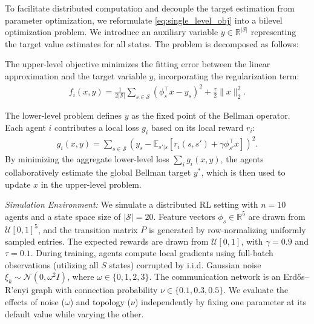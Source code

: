 \documentclass{article}
\theoremstyle{plain}
\theoremstyle{definition}
\theoremstyle{remark}
\begin{document}
To facilitate distributed computation and decouple the target estimation from parameter optimization, we reformulate \eqref{eq:single_level_obj} into a bilevel optimization problem. We introduce an auxiliary variable $y \in \mathbb{R}^{|\mathcal{S}|}$ representing the target value estimates for all states. The problem is decomposed as follows:


The upper-level objective minimizes the fitting error between the linear approximation and the target variable $y$, incorporating the regularization term:
\begin{align} \label{eq:upper_level_split}
    f_{i}(x, y) = \frac{1}{2|\mathcal{S}|} \sum_{s \in \mathcal{S}} (\phi_s^\top x - y_s)^2 + \frac{\tau}{2}\|x\|_2^{2}.
\end{align}

The lower-level problem defines $y$ as the fixed point of the Bellman operator. Each agent $i$ contributes a local loss $g_i$ based on its local reward $r_i$:
\begin{align} \label{eq:lower_level_split}
    g_i(x, y) = \sum_{s \in \mathcal{S}} \left( y_s - \mathbb{E}_{s'|s} \left[ r_i(s, s') + \gamma \phi_{s'}^\top x \right] \right)^2.
\end{align}
By minimizing the aggregate lower-level loss $\sum_i g_i(x,y)$, the agents collaboratively estimate the global Bellman target $y^*$, which is then used to update $x$ in the upper-level problem.

\textit{Simulation Environment:} We simulate a distributed RL setting with $n=10$ agents and a state space size of $|\mathcal{S}|=20$. Feature vectors $\phi_s \in \mathbb{R}^5$ are drawn from $\mathcal{U}[0, 1]^5$, and the transition matrix $P$ is generated by row-normalizing uniformly sampled entries. The expected rewards are drawn from $\mathcal{U}[0, 1]$, with $\gamma = 0.9$ and $\tau = 0.1$. During training, agents compute local gradients using full-batch observations (utilizing all $S$ states) corrupted by i.i.d. Gaussian noise $\xi_{k} \sim \mathcal{N}(0, \omega^2 I)$, where $\omega \in \{0, 1, 2, 3\}$. 
The communication network is an Erd\H{o}s--R'enyi graph with connection probability $\nu \in \{0.1, 0.3, 0.5\}$. We evaluate the effects of noise ($\omega$) and topology ($\nu$) independently by fixing one parameter at its default value while varying the other.
\end{document}
